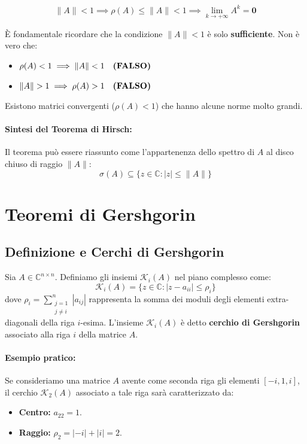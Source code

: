 \documentclass[a4paper,12pt]{article}
\begin{document}
	\begin{equation}
		\|A\| < 1 \implies \rho(A) \le \|A\| < 1 \implies \lim_{k \to +\infty} A^k = \mathbf{0}
	\end{equation}
	
	\begin{tcolorbox}[title=ATTENZIONE: Il viceversa non vale, colback=red!5!white, colframe=red!75!black]
		È fondamentale ricordare che la condizione $\|A\| < 1$ è solo \textbf{sufficiente}. Non è vero che:
		\begin{itemize}
			\item $\rho(A) < 1 \implies \|A\| < 1 \quad \text{\textbf{(FALSO)}}$
			\item $\|A\| > 1 \implies \rho(A) > 1 \quad \text{\textbf{(FALSO)}}$
		\end{itemize}
		Esistono matrici convergenti ($\rho(A) < 1$) che hanno alcune norme molto grandi.
	\end{tcolorbox}
	
	\paragraph{Sintesi del Teorema di Hirsch:}
	Il teorema può essere riassunto come l'appartenenza dello spettro di $A$ al disco chiuso di raggio $\|A\|$:
	\begin{equation}
		\sigma(A) \subseteq \{ z \in \mathbb{C} : |z| \le \|A\| \}
	\end{equation}
	\section{Teoremi di Gershgorin}
	
	\subsection{Definizione e Cerchi di Gershgorin}
	Sia $A \in \mathbb{C}^{n \times n}$. Definiamo gli insiemi $\mathcal{K}_i(A)$ nel piano complesso come:
	\begin{equation}
		\mathcal{K}_i(A) = \{z \in \mathbb{C} : |z - a_{ii}| \le \rho_i\}
	\end{equation}
	dove $\rho_i = \sum_{\substack{j=1 \\ j \neq i}}^{n} |a_{ij}|$ rappresenta la somma dei moduli degli elementi extra-diagonali della riga $i$-esima.
	L'insieme $\mathcal{K}_i(A)$ è detto \textbf{cerchio di Gershgorin} associato alla riga $i$ della matrice $A$.
	
	\paragraph{Esempio pratico:}
	Se consideriamo una matrice $A$ avente come seconda riga gli elementi $[-i, 1, i]$, il cerchio $\mathcal{K}_2(A)$ associato a tale riga sarà caratterizzato da:
	\begin{itemize}
		\item \textbf{Centro:} $a_{22} = 1$.
		\item \textbf{Raggio:} $\rho_2 = |-i| + |i| = 2$.
	\end{itemize}
	
\end{document}
